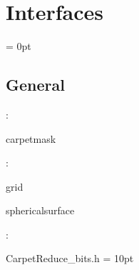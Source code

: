 
\section{Interfaces} 


\parskip = 0pt

\vspace{3mm} \subsection*{General}

: 

carpetmask
\vspace{2mm}

: 

grid

sphericalsurface
\vspace{2mm}

\vspace{5mm}

: 

CarpetReduce\_bits.h
\vspace{2mm}\parskip = 10pt 
